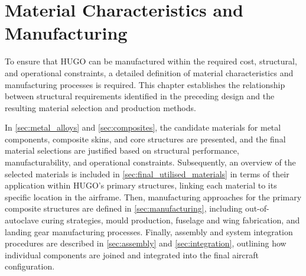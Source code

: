 \chapter{Material Characteristics and Manufacturing}
\label{ch:material_characteristics}



To ensure that HUGO can be manufactured within the required cost, structural, and operational constraints, a detailed definition of material characteristics and manufacturing processes is required. This chapter establishes the relationship between structural requirements identified in the preceding design and the resulting material selection and production methods.

In \autoref{sec:metal_alloys} and \autoref{sec:composites}, the candidate materials for metal components, composite skins, and core structures are presented, and the final material selections are justified based on structural performance, manufacturability, and operational constraints. Subsequently, an overview of the selected materials is included in \autoref{sec:final_utilised_materials} in terms of their application within HUGO’s primary structures, linking each material to its specific location in the airframe. Then, manufacturing approaches for the primary composite structures are defined in \autoref{sec:manufacturing}, including out-of-autoclave curing strategies, mould production, fuselage and wing fabrication, and landing gear manufacturing processes. Finally, assembly and system integration procedures are described in \autoref{sec:assembly} and \autoref{sec:integration}, outlining how individual components are joined and integrated into the final aircraft configuration.

